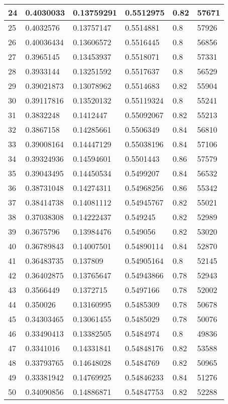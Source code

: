\begin{longtable}{|l|l|l|l|l|l|}
24 & 0.4030033 & 0.13759291 & 0.5512975 & 0.82 & 57671 \\ \hline 
25 & 0.4032576 & 0.13757147 & 0.5514881 & 0.8 & 57926 \\ \hline 
26 & 0.40036434 & 0.13606572 & 0.5516445 & 0.8 & 56856 \\ \hline 
27 & 0.3965145 & 0.13453937 & 0.5518071 & 0.8 & 57331 \\ \hline 
28 & 0.3933144 & 0.13251592 & 0.5517637 & 0.8 & 56529 \\ \hline 
29 & 0.39021873 & 0.13078962 & 0.5514683 & 0.82 & 55904 \\ \hline 
30 & 0.39117816 & 0.13520132 & 0.55119324 & 0.8 & 55241 \\ \hline 
31 & 0.3832248 & 0.1412447 & 0.55092067 & 0.82 & 55213 \\ \hline 
32 & 0.3867158 & 0.14285661 & 0.5506349 & 0.84 & 56810 \\ \hline 
33 & 0.39008164 & 0.14447129 & 0.55038196 & 0.84 & 57106 \\ \hline 
34 & 0.39324936 & 0.14594601 & 0.5501443 & 0.86 & 57579 \\ \hline 
35 & 0.39043495 & 0.14450534 & 0.5499207 & 0.84 & 56532 \\ \hline 
36 & 0.38731048 & 0.14274311 & 0.54968256 & 0.86 & 55342 \\ \hline 
37 & 0.38414738 & 0.14081112 & 0.54945767 & 0.82 & 55021 \\ \hline 
38 & 0.37038308 & 0.14222437 & 0.549245 & 0.82 & 52989 \\ \hline 
39 & 0.3675796 & 0.13984476 & 0.549056 & 0.82 & 53020 \\ \hline 
40 & 0.36789843 & 0.14007501 & 0.54890114 & 0.84 & 52870 \\ \hline 
41 & 0.36483735 & 0.137809 & 0.54905164 & 0.8 & 52145 \\ \hline 
42 & 0.36402875 & 0.13765647 & 0.54943866 & 0.78 & 52943 \\ \hline 
43 & 0.3566449 & 0.1372715 & 0.5497166 & 0.78 & 52002 \\ \hline 
44 & 0.350026 & 0.13160995 & 0.5485309 & 0.78 & 50678 \\ \hline 
45 & 0.34303465 & 0.13061455 & 0.5485029 & 0.78 & 50076 \\ \hline 
46 & 0.33490413 & 0.13382505 & 0.5484974 & 0.8 & 49836 \\ \hline 
47 & 0.3341016 & 0.14331841 & 0.54848176 & 0.82 & 53588 \\ \hline 
48 & 0.33793765 & 0.14648028 & 0.5484769 & 0.82 & 50965 \\ \hline 
49 & 0.33381942 & 0.14769925 & 0.54846233 & 0.84 & 51276 \\ \hline 
50 & 0.34090856 & 0.14886871 & 0.54847753 & 0.82 & 52288 \\ \hline 
\end{longtable}